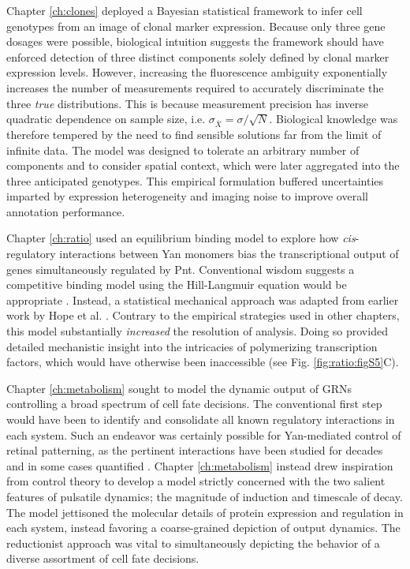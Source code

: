 Chapter \ref{ch:clones} deployed a Bayesian statistical framework to infer cell genotypes from an image of clonal marker expression. Because only three gene dosages were possible, biological intuition suggests the framework should have enforced detection of three distinct components solely defined by clonal marker expression levels. However, increasing the fluorescence ambiguity exponentially increases the number of measurements required to accurately discriminate the three \emph{true} distributions. This is because measurement precision has inverse quadratic dependence on sample size, i.e. $\sigma_{\bar{X}} = \sigma / \sqrt{N}$. Biological knowledge was therefore tempered by the need to find sensible solutions far from the limit of infinite data. The model was designed to tolerate an arbitrary number of components and to consider spatial context, which were later aggregated into the three anticipated genotypes. This empirical formulation buffered uncertainties imparted by expression heterogeneity and imaging noise to improve overall annotation performance.

Chapter \ref{ch:ratio} used an equilibrium binding model to explore how \textit{cis}-regulatory interactions between Yan monomers bias the transcriptional output of genes simultaneously regulated by Pnt. Conventional wisdom suggests a competitive binding model using the Hill-Langmuir equation would be appropriate \cite{Gesztelyi2012}. Instead, a statistical mechanical approach was adapted from earlier work by Hope et al. \cite{Hope2017}. Contrary to the empirical strategies used in other chapters, this model substantially \emph{increased} the resolution of analysis. Doing so provided detailed mechanistic insight into the intricacies of polymerizing transcription factors, which would have otherwise been inaccessible (see Fig. \ref{fig:ratio:figS5}C). 

Chapter \ref{ch:metabolism} sought to model the dynamic output of GRNs controlling a broad spectrum of cell fate decisions. The conventional first step would have been to identify and consolidate all known regulatory interactions in each system. Such an endeavor was certainly possible for Yan-mediated control of retinal patterning, as the pertinent interactions have been studied for decades \cite{Ready1976a,Rebay1995,Rohrbaugh2002,Li2009b,BoisclairLachance2014} and in some cases quantified \cite{Pelaez2015a}. Chapter \ref{ch:metabolism} instead drew inspiration from control theory to develop a model strictly concerned with the two salient features of pulsatile dynamics; the magnitude of induction and timescale of decay. The model jettisoned the molecular details of protein expression and regulation in each system, instead favoring a coarse-grained depiction of output dynamics. The reductionist approach was vital to simultaneously depicting the behavior of a diverse assortment of cell fate decisions.

